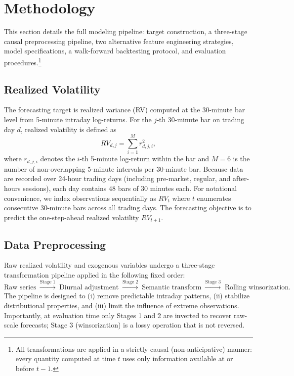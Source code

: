 \section{Methodology}
\label{sec:methodology}

This section details the full modeling pipeline: target construction, a three-stage causal preprocessing pipeline, two alternative feature engineering strategies, model specifications, a walk-forward backtesting protocol, and evaluation procedures.\footnote{All transformations are applied in a strictly causal (non-anticipative) manner: every quantity computed at time $t$ uses only information available at or before $t-1$.}

\subsection{Realized Volatility}
\label{sec:rv_definition}

The forecasting target is realized variance (RV) computed at the 30-minute bar level from 5-minute intraday log-returns. For the $j$-th 30-minute bar on trading day $d$, realized volatility is defined as
\begin{equation}
    RV_{d,j} = \sum_{i=1}^{M} r_{d,j,i}^2,
    \label{eq:rv}
\end{equation}
where $r_{d,j,i}$ denotes the $i$-th 5-minute log-return within the bar and $M = 6$ is the number of non-overlapping 5-minute intervals per 30-minute bar. Because data are recorded over 24-hour trading days (including pre-market, regular, and after-hours sessions), each day contains $48$ bars of 30 minutes each. For notational convenience, we index observations sequentially as $RV_t$ where $t$ enumerates consecutive 30-minute bars across all trading days. The forecasting objective is to predict the one-step-ahead realized volatility $RV_{t+1}$.

\subsection{Data Preprocessing}
\label{sec:preprocessing}

Raw realized volatility and exogenous variables undergo a three-stage transformation pipeline applied in the following fixed order:
\begin{equation}
    \text{Raw series} \;\xrightarrow{\text{Stage 1}}\; \text{Diurnal adjustment} \;\xrightarrow{\text{Stage 2}}\; \text{Semantic transform} \;\xrightarrow{\text{Stage 3}}\; \text{Rolling winsorization}.
    \label{eq:pipeline}
\end{equation}
The pipeline is designed to (i) remove predictable intraday patterns, (ii) stabilize distributional properties, and (iii) limit the influence of extreme observations. Importantly, at evaluation time only Stages 1 and 2 are inverted to recover raw-scale forecasts; Stage 3 (winsorization) is a lossy operation that is not reversed.

